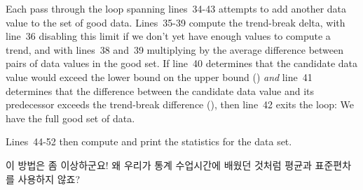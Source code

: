 Each pass through the loop spanning lines~34-43 attempts to add another
data value to the set of good data.
Lines~35-39 compute the trend-break delta, with line~36 disabling this
limit if we don't yet have enough values to compute a trend,
and with lines~38 and~39 multiplying  by the average
difference between pairs of data values in the good set.
If line~40 determines that the candidate data value would exceed the
lower bound on the upper bound () \emph{and}
line~41 determines that the difference between the candidate data value
and its predecessor exceeds the trend-break difference (),
then line~42 exits the loop: We have the full good set of data.

Lines~44-52 then compute and print the statistics for the data set.
\fi

\QuickQuiz{}
	이 방법은 좀 이상하군요!
	왜 우리가 통계 수업시간에 배웠던 것처럼 평균과 표준편차를 사용하지
	않죠?
	\iffalse

